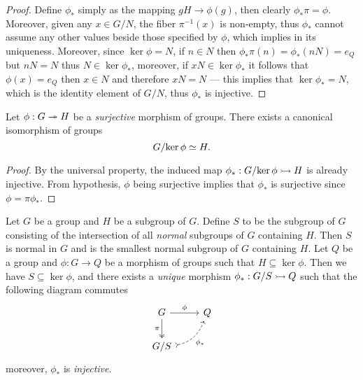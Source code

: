 \begin{proof}
    Define \(\phi_{*}\) simply as the mapping \(gH \to \phi(g)\), then clearly
    \(\phi_{*} \pi = \phi\). Moreover, given any \(x \in G/N\), the fiber
    \(\pi^{-1}(x)\) is non-empty, thus \(\phi_{*}\) cannot assume any other values
    beside those specified by \(\phi\), which implies in its uniqueness. Moreover,
    since \(\ker \phi = N\), if \(n \in N\) then
    \(\phi_{*} \pi(n) = \phi_{*}(n N) = e_{Q}\) but \(n N = N\) thus
    \(N \in \ker \phi_{*}\), moreover, if \(x N \in \ker \phi_{*}\) it follows that
    \(\phi(x) = e_Q\) then \(x \in N\) and therefore \(x N = N\) --- this implies
    that \(\ker \phi_{*} = N\), which is the identity element of \(G/N\), thus
    \(\phi_{*}\) is injective.
\end{proof}

\begin{corollary}
    \label{cor:first-iso-grp}
    Let \(\phi: G \twoheadrightarrow H\) be a \emph{surjective} morphism of groups. There exists a
    canonical isomorphism of groups
    \[
        G/{\ker \phi} \simeq H.
    \]
\end{corollary}

\begin{proof}
    By the universal property, the induced map \(\phi_{*}: G/{\ker \phi} \rightarrowtail H\)
    is already injective. From hypothesis, \(\phi\) being surjective implies that
    \(\phi_{*}\) is surjective since \(\phi = \pi \phi_{*}\).
\end{proof}

\begin{corollary}
    \label{cor:universal-property-quotients-grp}
    Let \(G\) be a group and \(H\) be a subgroup of \(G\). Define \(S\) to be the
    subgroup of \(G\) consisting of the intersection of all \emph{normal} subgroups
    of \(G\) containing \(H\). Then \(S\) is normal in \(G\) and is the smallest
    normal subgroup of \(G\) containing \(H\). Let \(Q\) be a group and
    \(\phi: G \to Q\) be a morphism of groups such that \(H \subseteq \ker
    \phi\). Then we have \(S \subseteq \ker \phi\), and there exists a \emph{unique}
    morphism \(\phi_{*}: G/S \rightarrowtail Q\) such that the following diagram commutes
    \[
        \begin{tikzcd}
            G \ar[d, two heads, swap, "\pi"] \ar[r, "\phi"] &Q \\
            G/S \ar[ur, dashed, swap, bend right, tail, "\phi_{*}"] &
        \end{tikzcd}
    \]
    moreover, \(\phi_{*}\) is \emph{injective}.
\end{corollary}

